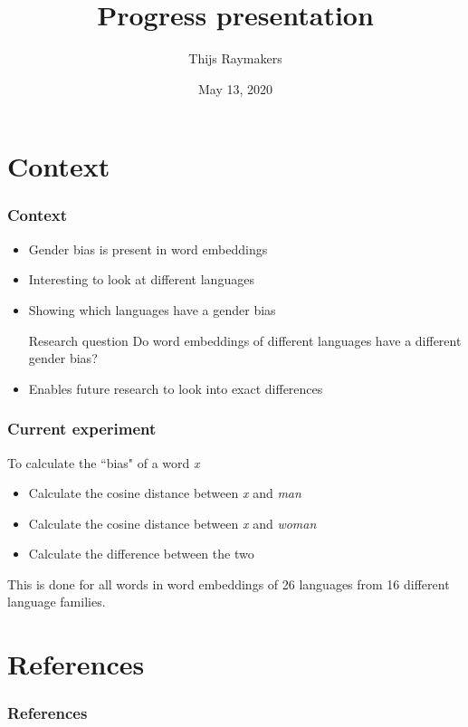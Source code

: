 \documentclass[handout]{beamer}
\author{Thijs Raymakers}
\title{Progress presentation}
\date{May 13, 2020}
\begin{document}
\begin{frame}
    \titlepage
\end{frame}

\section{Context}
\begin{frame}
\frametitle{Context}
\begin{itemize}
    \item Gender bias is present in word embeddings~
    \pause
    \item Interesting to look at different languages
    \pause
    \item Showing which languages have a gender bias
    \pause
    \begin{block}{Research question}
        Do word embeddings of different languages have a different gender bias?
    \end{block}
    \pause
    \item Enables future research to look into exact differences
\end{itemize}
\end{frame}

\begin{frame}
    \frametitle{Current experiment}
    To calculate the ``bias" of a word \textit{x}
    \begin{itemize}
        \item Calculate the cosine distance between \textit{x} and \textit{man}
        \item Calculate the cosine distance between \textit{x} and \textit{woman}
        \item Calculate the difference between the two 
    \end{itemize}
    \pause
    This is done for all words in word embeddings of 26 languages from 
    16 different language families.
\end{frame}

\section{References}
\begin{frame}
\frametitle{References}
\printbibliography[heading=none]
\end{frame}
\end{document}
